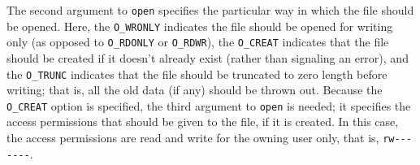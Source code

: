 The second argument to \verb|open| specifies the particular way in
which the file should be opened.  Here, the \verb|O_WRONLY| indicates
the file should be opened for writing only (as opposed to
\verb|O_RDONLY| or \verb|O_RDWR|), the \verb|O_CREAT| indicates that
the file should be created if it doesn't already exist (rather than
signaling an error), and the \verb|O_TRUNC| indicates that the file
should be truncated to zero length before writing; that is, all the old
data (if any) should be thrown out.  Because the \verb|O_CREAT| option
is specified, the third argument to \verb|open| is needed; it
specifies the access permissions that should be given to the file, if
it is created.  In this case, the access permissions are read and
write for the owning user only, that is, \verb|rw-------|.


